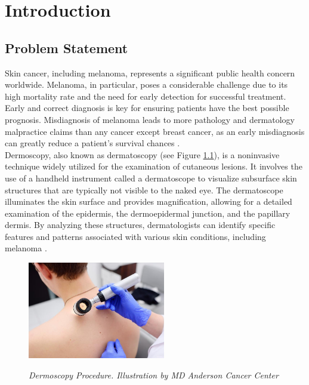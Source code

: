\chapter{Introduction}
\label{cap:intro}

\section{Problem Statement}

Skin cancer, including melanoma, represents a significant public health concern
worldwide. Melanoma, in particular, poses a considerable challenge due to its
high mortality rate and the need for early detection for successful treatment.
Early and correct diagnosis is key for ensuring patients have the best possible
prognosis. Misdiagnosis of melanoma leads to more pathology and dermatology
malpractice claims than any cancer except breast cancer, as an early
misdiagnosis can greatly reduce a patient's survival chances \cite{Melanoma}. \\

Dermoscopy, also known as dermatoscopy (see Figure \ref{fig:procedure_dermoscopy}),
is a noninvasive technique widely utilized for the examination of cutaneous
lesions. It involves the use of a handheld instrument called a dermatoscope to
visualize subsurface skin structures that are typically not visible to the
naked eye. The dermatoscope illuminates the skin surface and provides
magnification, allowing for a detailed examination of the epidermis, the
dermoepidermal junction, and the papillary dermis. By analyzing these
structures, dermatologists can identify specific features and patterns
associated with various skin conditions, including melanoma \cite{Dermoscopy}.

\begin{figure}[htb] \centering
  \includegraphics[width=6cm]{imatges/introduction/medical_procedure_dermastocopy.jpeg}
  \caption[Dermoscopy Procedure]{\textit{Dermoscopy Procedure. Illustration by MD Anderson Cancer Center}}
  {\label{fig:procedure_dermoscopy}}
\end{figure}

